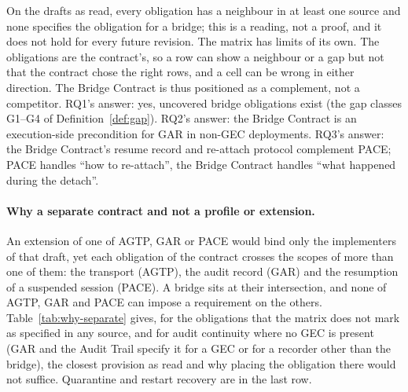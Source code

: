 On the drafts as read, every obligation has a neighbour in at least one source and
none specifies the obligation for a bridge; this is
a reading, not a proof, and it does not hold for every future revision. The
matrix has limits of its own. The obligations are the contract's, so a row
can show a neighbour or a gap but not that the contract chose the right
rows, and a cell can be wrong in either direction. The Bridge Contract is
thus positioned as a complement, not a competitor. RQ1's answer: yes,
uncovered bridge obligations exist (the gap classes G1--G4 of
Definition~\ref{def:gap}). RQ2's answer: the Bridge Contract is an
execution-side precondition for GAR in non-GEC deployments. RQ3's
answer: the Bridge Contract's resume record and re-attach protocol complement
PACE; PACE handles ``how to re-attach'', the Bridge Contract handles
``what happened during the detach''.

\paragraph{Why a separate contract and not a profile or extension.}
An extension of one of AGTP, GAR or PACE would bind only the implementers
of that draft, yet each obligation of the contract crosses the scopes of
more than one of them: the transport (AGTP), the audit record (GAR) and
the resumption of a suspended session (PACE). A bridge sits at their
intersection, and none of AGTP, GAR and PACE can impose a requirement on the
others. Table~\ref{tab:why-separate} gives, for the obligations that the
matrix does not mark as specified in any source, and for audit continuity
where no GEC is present (GAR and the Audit Trail specify it for a GEC or
for a recorder other than the bridge), the closest provision as read and
why placing the obligation there would not suffice. Quarantine and restart
recovery are in the last row.


